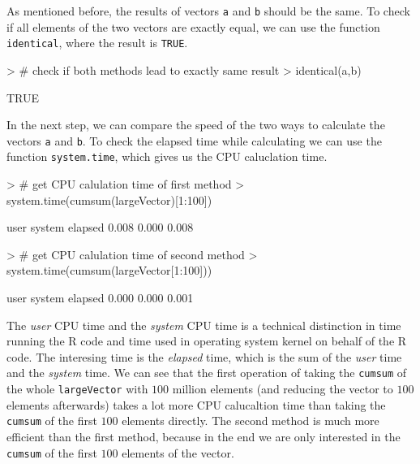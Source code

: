 \documentclass{article}
\begin{document}
As mentioned before, the results of vectors \texttt{a} and \texttt{b} should be the same. To check if all elements of the two vectors are exactly equal, we can use the function \texttt{identical}, where the result is \texttt{TRUE}.

\begin{Schunk}
\begin{Sinput}
> # check if both methods lead to exactly same result
> identical(a,b)
\end{Sinput}
\begin{Soutput}
[1] TRUE
\end{Soutput}
\end{Schunk}

In the next step, we can compare the speed of the two ways to calculate the vectors \texttt{a} and \texttt{b}. To check the elapsed time while calculating we can use the function \texttt{system.time}, which gives us the CPU caluclation time.

\begin{Schunk}
\begin{Sinput}
> # get CPU calulation time of first method
> system.time(cumsum(largeVector)[1:100])
\end{Sinput}
\begin{Soutput}
   user  system elapsed 
  0.008   0.000   0.008 
\end{Soutput}
\begin{Sinput}
> # get CPU calulation time of second method
> system.time(cumsum(largeVector[1:100]))
\end{Sinput}
\begin{Soutput}
   user  system elapsed 
  0.000   0.000   0.001 
\end{Soutput}
\end{Schunk}

The \emph{user} CPU time and the \emph{system} CPU time is a technical distinction in time running the R code and time used in operating system kernel on behalf of the R code. The interesing time is the \emph{elapsed} time, which is the sum of the \emph{user} time and the \emph{system} time. We can see that the first operation of taking the \texttt{cumsum} of the whole \texttt{largeVector} with $100$ million elements (and reducing the vector to $100$ elements afterwards) takes a lot more CPU calucaltion time than taking the \texttt{cumsum} of the first $100$ elements directly. The second method is much more efficient than the first method, because in the end we are only interested in the \texttt{cumsum} of the first $100$ elements of the vector.
\end{document}
